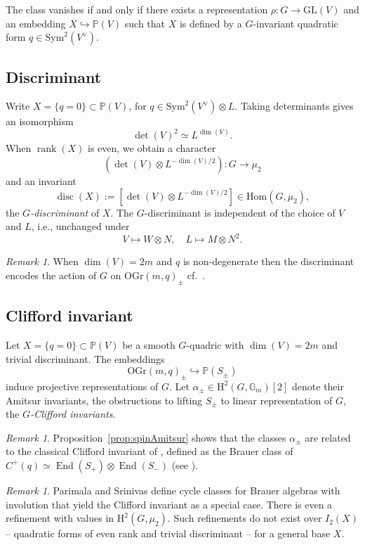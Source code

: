 \documentclass[12pt]{amsart}
\numberwithin{equation}{section}
\newcommand{\ra}{\rightarrow}
\newcommand{\bG}{\mathbb{G}}
\newcommand{\bP}{\mathbb{P}}
\newcommand{\rH}{\mathrm{H}}
\newcommand{\disc}{\operatorname{disc}}
\newcommand{\End}{\operatorname{End}}
\newcommand{\GL}{\mathrm{GL}}
\newcommand{\Hom}{\mathrm{Hom}}
\newcommand{\OGr}{\mathrm{OGr}}
\newcommand{\rank}{\operatorname{rank}}
\newcommand{\Sym}{\mathrm{Sym}}
\theoremstyle{plain}
\theoremstyle{definition}
\theoremstyle{remark}
\newtheorem{rema}[prop]{Remark}
\begin{document}
The class vanishes if and only if there exists a representation $\rho:G \ra \GL(V)$ and an embedding $X\hookrightarrow \bP(V)$ such that
$X$ is defined by a $G$-invariant quadratic form $q \in \Sym^2(V^{\vee})$. 


\subsection*{Discriminant}
Write $X=\{q=0\} \subset \bP(V)$, for $q\in \Sym^2(V^{\vee}) \otimes L$.
Taking determinants gives an isomorphism
$$\det(V)^2 \simeq L^{\dim(V)}.$$
When $\rank(X)$ is even, we obtain a character
$$\left(\det(V) \otimes L^{-\dim(V)/2}\right): G \ra \mu_2$$
and an invariant 
$$
\disc(X):=[\det(V) \otimes L^{-\dim(V)/2}] \in \Hom(G,\mu_2),
$$
the {\em $G$-discriminant} of $X$.  
The $G$-discriminant is independent of the choice of $V$ and $L$, i.e., unchanged under
$$V \mapsto W\otimes N, \quad L \mapsto M\otimes N^2.$$ 

\begin{rema} \label{rema:discmaxiso}
When $\dim(V)=2m$ and $q$ is non-degenerate then
the discriminant encodes the action of $G$ on
$\OGr(m,q)_{\pm}$ cf.~\cite[\S 85]{EKMbook}.
\end{rema}



\subsection*{Clifford invariant}
Let $X=\{q=0\} \subset \bP(V)$ be a smooth $G$-quadric with $\dim(V)=2m$ and trivial discriminant.
The embeddings
$$\OGr(m,q)_{\pm} \hookrightarrow \bP(S_{\pm})$$
induce projective representations of $G$.  
Let $\alpha_{\pm}\in \rH^2(G,\bG_m)[2]$ denote their Amitsur invariants, the obstructions
to lifting $S_{\pm}$ to linear representation of $G$, the {\em $G$-Clifford invariants}.


\begin{rema} Proposition~\ref{prop:spinAmitsur} shows that 
the classes $\alpha_{\pm}$ are related to the classical Clifford invariant of \cite[\S 14]{EKMbook}, defined as the 
Brauer class of $C^+(q)\simeq \End(S_+) \otimes \End(S_-)$ (see \cite[13.9]{EKMbook}). 
\end{rema}

\begin{rema}
Parimala and Srinivas \cite{ParSri} define 
cycle classes for Brauer algebras with 
involution that yield the
Clifford invariant as a special case.
There is even a refinement
with values in $\rH^2(G,\mu_2)$.
Such refinements do not exist over $I_2(X)$
-- quadratic forms of even rank and trivial 
discriminant -- for a general base $X$.   
\end{rema}
\end{document}
